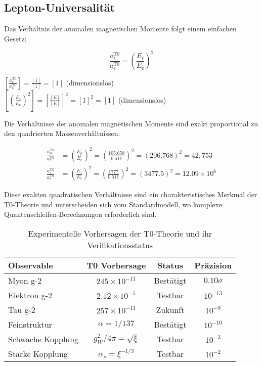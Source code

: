 \documentclass[12pt,a4paper]{article}
\newcommand{\ee}{\text{$\mathrm{e}$}}
\newcommand{\mmu}{\text{$\mu$}}
\newcommand{\ttau}{\text{$\tau$}}
\theoremstyle{definition}
\begin{document}
	\subsection{Lepton-Universalität}
	
	Das Verhältnis der anomalen magnetischen Momente folgt einem einfachen Gesetz:
	
	\begin{equation}
		\frac{a_{\ell}^{\text{T0}}}{a_{\ee}^{\text{T0}}} = \left(\frac{E_{\ell}}{E_{\ee}}\right)^2
	\end{equation}
	
	\begin{einheitencheck}
		$\left[\frac{a_{\ell}^{\text{T0}}}{a_{\ee}^{\text{T0}}}\right] = \frac{[1]}{[1]} = [1]$ (dimensionslos)\\
		$\left[\left(\frac{E_{\ell}}{E_{\ee}}\right)^2\right] = \left[\frac{[E]}{[E]}\right]^2 = [1]^2 = [1]$ (dimensionslos) \checkmark
	\end{einheitencheck}
	
	\begin{verhaltnis}
		Die Verhältnisse der anomalen magnetischen Momente sind exakt proportional zu den quadrierten Massenverhältnissen:
		
		\begin{align}
			\frac{a_{\mmu}^{\text{T0}}}{a_{\ee}^{\text{T0}}} &= \left(\frac{E_{\mmu}}{E_{\ee}}\right)^2 = \left(\frac{105.658}{0.511}\right)^2 = (206.768)^2 = 42{,}753\\
			\frac{a_{\ttau}^{\text{T0}}}{a_{\ee}^{\text{T0}}} &= \left(\frac{E_{\ttau}}{E_{\ee}}\right)^2 = \left(\frac{1777}{0.511}\right)^2 = (3477.5)^2 = 12.09 \times 10^6
		\end{align}
		
		Diese exakten quadratischen Verhältnisse sind ein charakteristisches Merkmal der T0-Theorie und unterscheiden sich vom Standardmodell, wo komplexe Quantenschleifen-Berechnungen erforderlich sind.
	\end{verhaltnis}
	\begin{table}[h]
		\centering
		\begin{tabular}{lccc}
			\toprule
			\textbf{Observable} & \textbf{T0 Vorhersage} & \textbf{Status} & \textbf{Präzision} \\
			\midrule
			Myon g-2 & $245 \times 10^{-11}$ & Bestätigt & $0.10\sigma$ \\
			Elektron g-2 & $2.12 \times 10^{-5}$ & Testbar & $10^{-13}$ \\
			Tau g-2 & $257 \times 10^{-11}$ & Zukunft & $10^{-9}$ \\
			Feinstruktur & $\alpha = 1/137$ & Bestätigt & $10^{-10}$ \\
			Schwache Kopplung & $g_W^2/4\pi = \sqrt{\xi}$ & Testbar & $10^{-3}$ \\
			Starke Kopplung & $\alpha_s = \xi^{-1/3}$ & Testbar & $10^{-2}$ \\
			\bottomrule
		\end{tabular}
		\caption{Experimentelle Vorhersagen der T0-Theorie und ihr Verifikationsstatus}
	\end{table}
	
\end{document}
